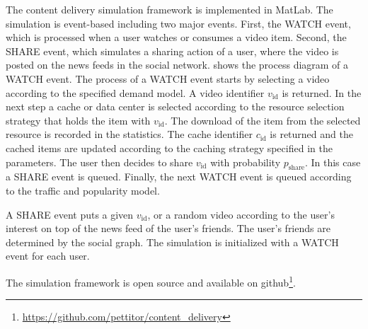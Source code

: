 The content delivery simulation framework is implemented in MatLab.
The simulation is event-based including two major events.
First, the WATCH event, which is processed when a user watches or consumes a video item.
Second, the SHARE event, which simulates a sharing action of a user, where the video is posted on the news feeds in the social network.
 shows the process diagram of a WATCH event.
The process of a WATCH event starts by selecting a video according to the specified demand model.
A video identifier $v_\text{id}$ is returned.
In the next step a cache or data center is selected according to the resource selection strategy that holds the item with $v_\text{id}$.
The download of the item from the selected resource is recorded in the statistics.
The cache identifier $c_\text{id}$ is returned and the cached items are updated according to the caching strategy specified in the parameters.
The user then decides to share $v_\text{id}$ with probability $p_\text{share}$.
In this case a SHARE event is queued.
Finally, the next WATCH event is queued according to the traffic and popularity model.

A SHARE event puts a given $v_\text{id}$, or a random video according to the user's interest on top of the news feed of the user's friends.
The user's friends are determined by the social graph.
The simulation is initialized with a WATCH event for each user.

The simulation framework is open source and available on github\footnote{\url{https://github.com/pettitor/content_delivery}}.
